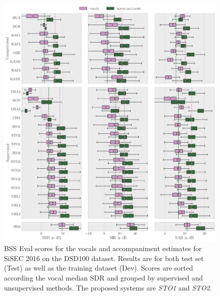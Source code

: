 \begin{figure}[htbp]
	\includegraphics[width=\textwidth]{Chapters/06_Separation_Unknown/figures/evaluation.pdf}
	\caption{BSS Eval scores for the vocals and accompaniment estimates for SiSEC 2016 on the DSD100 dataset. Results are for both test set (Test) as well as the training dataset (Dev). Scores are sorted according the vocal median SDR and grouped by supervised and unsupervised methods. The proposed systems are \emph{STO1} and \emph{STO2}.}
	\label{fig:eval}
\end{figure}

